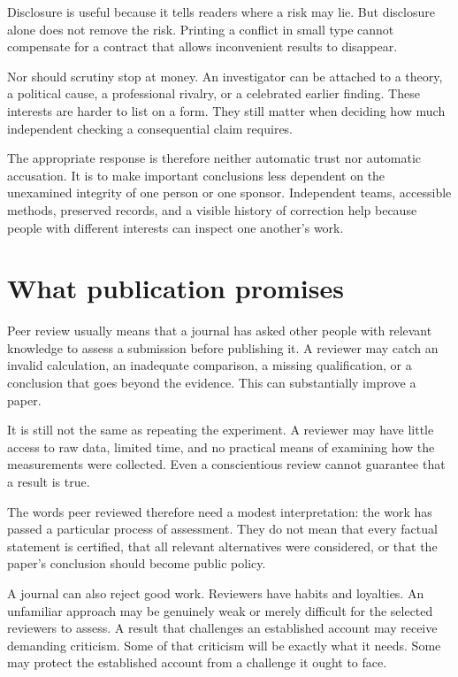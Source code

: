 \documentclass[12pt,a4paper]{book}
\begin{document}
Disclosure is useful because it tells readers where a risk may lie. But disclosure alone does not remove the risk. Printing a conflict in small type cannot compensate for a contract that allows inconvenient results to disappear.

Nor should scrutiny stop at money. An investigator can be attached to a theory, a political cause, a professional rivalry, or a celebrated earlier finding. These interests are harder to list on a form. They still matter when deciding how much independent checking a consequential claim requires.

The appropriate response is therefore neither automatic trust nor automatic accusation. It is to make important conclusions less dependent on the unexamined integrity of one person or one sponsor. Independent teams, accessible methods, preserved records, and a visible history of correction help because people with different interests can inspect one another's work.

\section*{What publication promises}

Peer review usually means that a journal has asked other people with relevant knowledge to assess a submission before publishing it. A reviewer may catch an invalid calculation, an inadequate comparison, a missing qualification, or a conclusion that goes beyond the evidence. This can substantially improve a paper.

It is still not the same as repeating the experiment. A reviewer may have little access to raw data, limited time, and no practical means of examining how the measurements were collected. Even a conscientious review cannot guarantee that a result is true.

The words peer reviewed therefore need a modest interpretation: the work has passed a particular process of assessment. They do not mean that every factual statement is certified, that all relevant alternatives were considered, or that the paper's conclusion should become public policy.

A journal can also reject good work. Reviewers have habits and loyalties. An unfamiliar approach may be genuinely weak or merely difficult for the selected reviewers to assess. A result that challenges an established account may receive demanding criticism. Some of that criticism will be exactly what it needs. Some may protect the established account from a challenge it ought to face.
\end{document}
